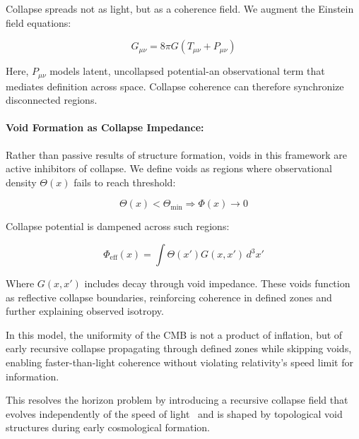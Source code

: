 Collapse spreads not as light, but as a coherence field. We augment the Einstein field equations:

\[ G_{\mu\nu} = 8\pi G (T_{\mu\nu} + P_{\mu\nu}) \]

Here, \( P_{\mu\nu} \) models latent, uncollapsed potential-an observational term that mediates definition across space. Collapse coherence can therefore synchronize disconnected regions.

\paragraph{Void Formation as Collapse Impedance:}
Rather than passive results of structure formation, voids in this framework are active inhibitors of collapse. We define voids as regions where observational density \( \Theta(x) \) fails to reach threshold:

\[ \Theta(x) < \Theta_{\text{min}} \Rightarrow \Phi(x) \rightarrow 0 \]

Collapse potential is dampened across such regions:

\[ \Phi_{\text{eff}}(x) = \int \Theta(x') G(x, x') \, d^3x' \]

Where \( G(x, x') \) includes decay through void impedance. These voids function as reflective collapse boundaries, reinforcing coherence in defined zones and further explaining observed isotropy.

In this model, the uniformity of the CMB is not a product of inflation, but of early recursive collapse propagating through defined zones while skipping voids, enabling faster-than-light coherence without violating relativity's speed limit for information.

\vspace{1em}
This resolves the horizon problem by introducing a recursive collapse field that evolves independently of the speed of light~\cite{ashtekar2004background} and is shaped by topological void structures during early cosmological formation.

\nocite{*}
\printbibliography[title={Appendix H References}, keyword=chapter9]
